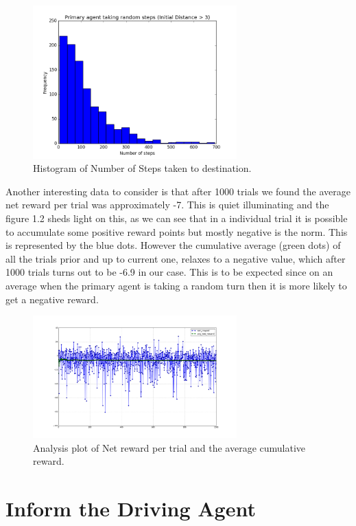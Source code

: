\documentclass[paper=a4, fontsize=11pt]{scrartcl}
\numberwithin{equation}{section}		%
\numberwithin{figure}{section}			%
\numberwithin{table}{section}				%
\begin{document}
 \begin{figure}[!ht]
 	\caption{Histogram of Number of Steps taken to destination.}
 	\centering
 	\includegraphics[width=0.7\textwidth]{hist3}
 \end{figure}
  
  
  Another interesting data to consider is that after 1000 trials we found the average net reward per trial was approximately -7.  This is quiet illuminating and the figure 1.2 sheds light on this, as we can see that in a individual trial it is possible to accumulate some positive reward points but mostly negative is the norm. This is represented by the blue dots. However the cumulative average (green dots) of all the trials prior and up to current one, relaxes to a negative value, which after 1000 trials turns out to be -6.9 in our case. This is to be expected since on an average when the primary agent is taking a random turn then it is more likely to get a negative reward.
  
  
  \begin{figure}[!ht]
  	\caption{Analysis plot of Net reward per trial and the average cumulative reward.}
  	\centering
  	\includegraphics[width=0.7\textwidth]{avg-net-reward}
  \end{figure}
  
\pagebreak
\section{Inform the Driving Agent} 
\end{document}
